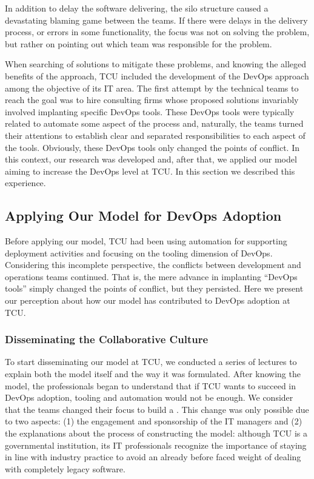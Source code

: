 In addition to delay the software delivering, the silo structure caused a
devastating blaming game between the teams. If there were delays in the delivery process,
or errors in some functionality, the focus was not on solving the problem, but
rather on pointing out which team was responsible for the problem.

When searching of solutions to mitigate these problems, and knowing the alleged benefits of
the approach, TCU included the development of the DevOps approach among the
objective of its IT area. The first attempt by the technical teams to reach the
goal was to hire consulting firms whose proposed solutions invariably involved
implanting specific DevOps tools. These DevOps tools were typically related to
automate some aspect of the process and, naturally, the teams turned their
attentions to establish clear and separated responsibilities to each aspect of
the tools. Obviously, these DevOps tools only changed the points of conflict.
In this context, our research was developed and, after that, we applied our
model aiming to increase the DevOps level at TCU. In this section we described
this experience.

\subsection{Applying Our Model for DevOps Adoption}

Before applying our model, TCU had been using automation for supporting deployment
activities and focusing on the tooling dimension of DevOps.
Considering this incomplete perspective, the conflicts between
development and operations teams continued. That is, the mere advance in
implanting ``DevOps tools'' simply changed the points of conflict, but they
persisted. Here we present our perception about how our model has contributed to DevOps
adoption at TCU.

\subsubsection{Disseminating the Collaborative Culture}


To start disseminating our model at TCU, we conducted a series of lectures to
explain both the model itself and the way it was formulated. After knowing the
model, the professionals began to understand that if TCU wants to succeed in
DevOps adoption, tooling and automation would not be enough. We consider that
the teams changed their focus to build a \cc. This change was only possible due
to two aspects: (1) the engagement and sponsorship of the IT managers and (2) the
explanations about the process of constructing the model: although TCU is a
governmental institution, its IT professionals recognize the importance of
staying in line with industry practice to avoid an already before faced weight
of dealing with completely legacy software.

